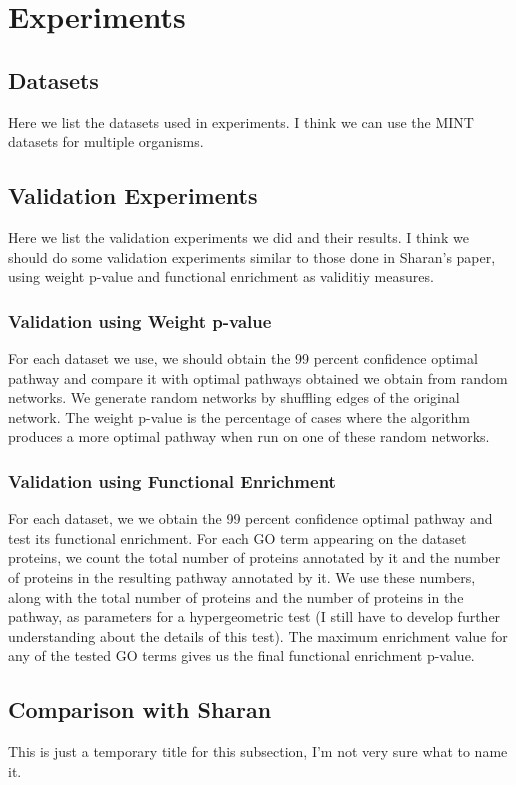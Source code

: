 \documentclass{ws-procs11x85}
\begin{document}
\section{Experiments}

\subsection{Datasets}
Here we list the datasets used in experiments. I think we can use the MINT
datasets for multiple organisms.

\subsection{Validation Experiments}
Here we list the validation experiments we did and their results. I think we
should do some validation experiments similar to those done in Sharan's paper,
using weight p-value and functional enrichment as validitiy measures.

\subsubsection{Validation using Weight p-value}
For each dataset we use, we should obtain the 99 percent confidence optimal
pathway and compare it with optimal pathways obtained we obtain from random
networks. We generate random networks by shuffling edges of the original
network. The weight p-value is the percentage of cases where the algorithm
produces a more optimal pathway when run on one of these random networks.

\subsubsection{Validation using Functional Enrichment}
 For each dataset, we we obtain the 99 percent confidence optimal pathway and
 test its functional enrichment. For each GO term appearing on the dataset
 proteins, we count the total number of proteins annotated by it and the
 number of proteins in the resulting pathway annotated by it. We use these
 numbers, along with the total number of proteins and the number of proteins in
 the pathway, as parameters for a hypergeometric test (I still have to develop
 further understanding about the details of this test). The maximum enrichment
 value for any of the tested GO terms gives us the final functional enrichment
 p-value.

\subsection{Comparison with Sharan}
This is just a temporary title for this subsection, I'm not very sure what to
name it.
\end{document}
